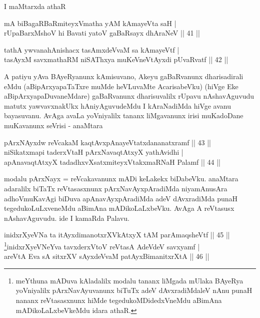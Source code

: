 \begin{artha}
I maMtarxda athaR \ndash 
\end{artha}

\begin{shl}
mA biBagaRBaRmiteyxVmatha yAM kAmayeVta saH | \\
rUpaBarxMshoV hi Bavati yatoV gaBaRsayx dhAraNeV \hfill|| 41 || 
\end{shl}

\begin{shl}
tathA ywvanahAnishacx tasAmxdeVvaM sa kAmayeVtf | \\
tasAyxM savxmathaRM niSAThxya muKeVneVtAyxdi pUvaRvatf \hfill|| 42 || 
\end{shl}

\begin{artha}
A patiyu yAva BAyeRyanunx kAmisuvano, Akeyu gaBaRvanunx dharisadirali 
eMdu (aBipArxyapaTaTxre muMde heVLuvaMte AcarisabeVku) (hiVge Eke 
aBipArxyapaDuvaneMdare) gaBaRvanunx dharisuvalilx rUpavu nAshavAguvudu 
matutx yawvavxnakUkx hAniyAguvudeMdu I kAraNadiMda hiVge avanu 
bayasuvanu. AvAga avaLa yoVniyalilx tananx liMgavanunx irisi 
muKadoDane muKavanunx seVrisi - anaMtara
\end{artha}

\begin{shl}
pArxNAyx\s \s dw reVcakaM kaqtAvx\s pAnayeVtatxdananatxramf \hfill|| 43 || \\
niSikatxmapi taderxVtaH pArxNavaqtAtxyX yathAvidhi | \\
apAnavaqtAtxyX tadadhxvXsatxmiteyxVtakxmaRNaH Palamf \hfill|| 44 || 
\end{shl}

\begin{artha}
modalu pArxNayx = reVcakavanunx mADi keLakekx biDabeVku. anaMtara 
adaralilx biTaTx reVtasasxnunx pArxNavAyxpAradiMda niyamAnusAra 
adhoVmuKavAgi biDuva apAnavAyxpAradiMda adeV dAvxradiMda punaH 
tegedukoLuLxveneMdu aBimAna mADikoLaLxbeVku. AvAga A reVtasusx 
nAshavAguvudu. ide I kamaRda Palavu.
\end{artha}



\begin{shl}
inidxrXyeVNa ta itAyxdimanotxrXVkAtxyX tAM parAmaqsheVtf \hfill|| 45 || \\
\footnote{meYthuna mADuva kAladalilx modalu tananx liMgada mUlaka 
BAyeRya yoVniyalilx pArxNavAyuvanunx biTuTx adeV dAvxradiMdaleV nAnu 
punaH nananx reVtasasxnunx hiMde tegedukoMDidedxVneMdu aBimAna 
mADikoLaLxbeVkeMdu idara athaR.}inidxrXyeVNeYva tavxderxVtoV reVtasA AdeVdeV savxyamf | \\
areVtA Eva sA sitxrXV sAyxdeVvaM patAyx\s BimanitxrXtA \hfill|| 46 || 
\end{shl}

